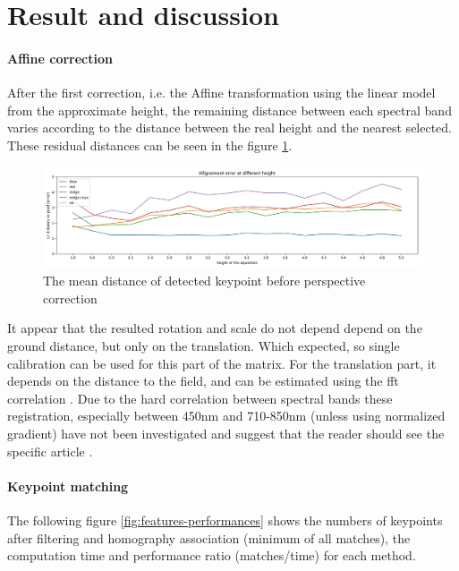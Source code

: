 \documentclass[]{elsarticle}
\begin{document}
	\section{Result and discussion}
	
	\paragraph{Affine correction}
	After the first correction, i.e. the Affine transformation using the linear model from the approximate height,
	the remaining distance between each spectral band varies according to the distance between the real height and the nearest selected.
	These residual distances can be seen in the figure \ref{fig:affine-error}.
	
	\begin{figure}[!htb]
		\centering
		\includegraphics[width=\linewidth]{../figures/affine-allignement-rmse.jpg}
		\caption{The mean distance of detected keypoint before perspective correction}
		\label{fig:affine-error}
	\end{figure}
	
	It appear that the resulted rotation and scale do not depend depend on the ground distance, but only on the translation.
	Which expected, so single calibration can be used for this part of the matrix.
	For the translation part, it depends on the distance to the field, and can be estimated using the fft correlation \cite{506761}.
	Due to the hard correlation between spectral bands these registration, especially between 450nm and 710-850nm (unless using normalized gradient)
	have not been investigated and suggest that the reader should see the specific article \cite{rabatel:hal-01684135}.
	
	
	\paragraph{Keypoint matching} 
	The following figure \ref{fig:features-performances} shows the numbers of keypoints after filtering and homography association (minimum of all matches),
	the computation time and performance ratio (matches/time) for each method.
	
\end{document}
